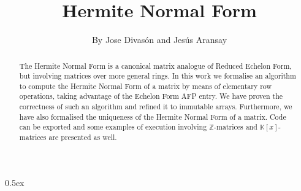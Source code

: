 \documentclass[11pt,a4paper]{article}
\begin{document}
\title{Hermite Normal Form}
\author{By Jose Divas\'on and Jes\'us Aransay}
\maketitle

\begin{abstract}
The Hermite Normal Form is a canonical matrix analogue of Reduced Echelon Form, but involving matrices over more general rings.
In this work we formalise an algorithm to compute the Hermite Normal Form of a matrix by means of elementary row operations, 
taking advantage of the Echelon Form AFP entry. We have proven the correctness of such an algorithm and refined it to immutable arrays.
Furthermore, we have also formalised the uniqueness of the Hermite Normal Form of a matrix.
Code can be exported and some examples of execution involving $\mathbb{Z}$-matrices and $\mathbb{K}[x]$-matrices are presented as well.
\end{abstract}

\tableofcontents

\parindent 0pt\parskip 0.5ex


\end{document}
